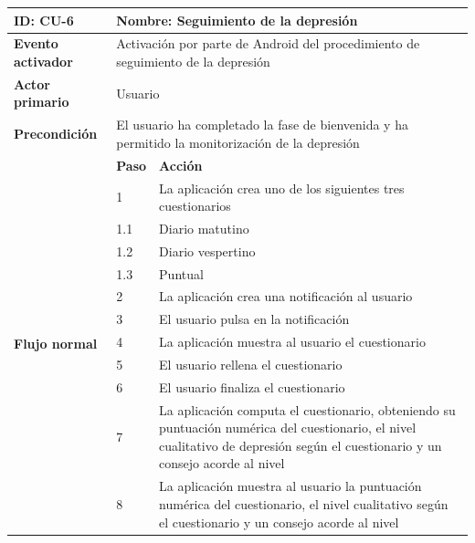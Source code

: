             \begin{table}[h]
                \centering
                \begin{tabularx}{\textwidth}{|l|l|X|}
                    \hline
                    \textbf{ID:} CU-6 & \multicolumn{2}{|X|}{\textbf{Nombre}: Seguimiento de la depresión} \\
                    \hline
                    \textbf{Evento activador} & \multicolumn{2}{|X|}{Activación por parte de Android del procedimiento de seguimiento de la depresión} \\
                    \hline
                    \textbf{Actor primario} & \multicolumn{2}{|X|}{Usuario} \\
                    \hline
                    \textbf{Precondición} & \multicolumn{2}{|X|}{El usuario ha completado la fase de bienvenida y ha permitido la monitorización de la depresión} \\
                    \hline
                    \multirow{13}{*}{\textbf{Flujo normal}} & \textbf{Paso} & \textbf{Acción} \\
                    \cline{2-3} & 1 & La aplicación crea uno de los siguientes tres cuestionarios \\
                    \cline{2-3} & 1.1 & Diario matutino \\
                    \cline{2-3} & 1.2 & Diario vespertino \\
                    \cline{2-3} & 1.3 & Puntual \\
                    \cline{2-3} & 2 & La aplicación crea una notificación al usuario \\
                    \cline{2-3} & 3 & El usuario pulsa en la notificación \\
                    \cline{2-3} & 4 & La aplicación muestra al usuario el cuestionario \\
                    \cline{2-3} & 5 & El usuario rellena el cuestionario \\
                    \cline{2-3} & 6 & El usuario finaliza el cuestionario \\
                    \cline{2-3} & 7 & La aplicación computa el cuestionario, obteniendo su puntuación numérica del cuestionario, el nivel cualitativo de depresión según el cuestionario y un consejo acorde al nivel \\
                    \cline{2-3} & 8 & La aplicación muestra al usuario la puntuación numérica del cuestionario, el nivel cualitativo según el cuestionario y un consejo acorde al nivel \\

\end{tabularx}
\end{table}
